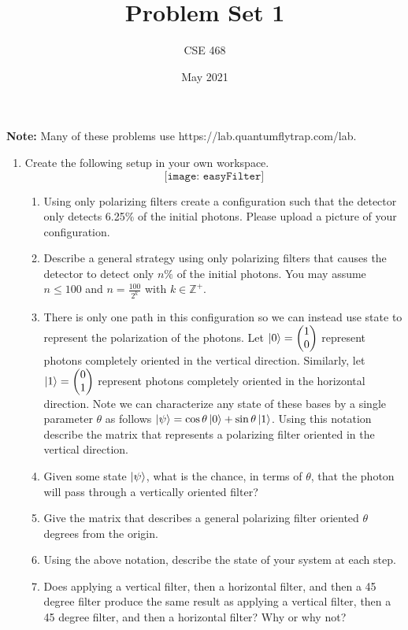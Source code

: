 \documentclass[12pt]{article}
\title{Problem Set 1}
\author{CSE 468}
\date{May 2021}
\begin{document}
\maketitle

\noindent \textbf{Note:} Many of these problems use https://lab.quantumflytrap.com/lab.

\begin{enumerate}[font=\bfseries]
    \item Create the following setup in your own workspace.\\
    \[\texttt{[image: easyFilter]}\]
    \begin{enumerate}
        \item Using only polarizing filters create a configuration such that the detector only detects 6.25$\%$ of the initial photons. Please upload a picture of your configuration.
        \item Describe a general strategy using only polarizing filters that causes the detector to detect only $n\%$ of the initial photons. You may assume $n \leq 100$ and $n = \frac{100}{2^k}$ with $k\in\mathbb{Z}^+$.
        \item There is only one path in this configuration so we can instead use state to represent the polarization of the photons. Let $\ket{0} = \begin{pmatrix}1 \\ 0 \end{pmatrix}$ represent photons completely oriented in the vertical direction. Similarly, let $\ket{1} = \begin{pmatrix}0 \\ 1 \end{pmatrix}$ represent photons completely oriented in the horizontal direction. Note we can characterize any state of these bases by a single parameter $\theta$ as follows $\ket{\psi} = \cos{\theta}\ket{0} + \sin{\theta}\ket{1}$. Using this notation describe the matrix that represents a polarizing filter oriented in the vertical direction.
        \item Given some state $\ket{\psi}$, what is the chance, in terms of $\theta$, that the photon will pass through a vertically oriented filter?
        \item Give the matrix that describes a general polarizing filter oriented $\theta$ degrees from the origin.
        \item Using the above notation, describe the state of your system at each step.
        \item Does applying a vertical filter, then a horizontal filter, and then a 45 degree filter produce the same result as applying a vertical filter, then a 45 degree filter, and then a horizontal filter? Why or why not?

\end{enumerate}
\end{enumerate}
\end{document}
